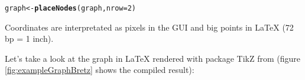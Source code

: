 \documentclass[a4paper, 10pt]{article}\usepackage[]{graphicx}\usepackage[]{color}
\makeatletter
\newcommand{\hlnum}[1]{\textcolor[rgb]{0.686,0.059,0.569}{#1}}%
\newcommand{\hlstd}[1]{\textcolor[rgb]{0.345,0.345,0.345}{#1}}%
\newcommand{\hlkwb}[1]{\textcolor[rgb]{0.69,0.353,0.396}{#1}}%
\newcommand{\hlkwc}[1]{\textcolor[rgb]{0.333,0.667,0.333}{#1}}%
\newcommand{\hlkwd}[1]{\textcolor[rgb]{0.737,0.353,0.396}{\textbf{#1}}}%
\newenvironment{kframe}{%
 \def\at@end@of@kframe{}%
 \ifinner\ifhmode%
  \def\at@end@of@kframe{\end{minipage}}%
  \begin{minipage}{\columnwidth}%
 \fi\fi%
 \def\FrameCommand##1{\hskip\@totalleftmargin \hskip-\fboxsep
 \colorbox{shadecolor}{##1}\hskip-\fboxsep
     \hskip-\linewidth \hskip-\@totalleftmargin \hskip\columnwidth}%
 \MakeFramed {\advance\hsize-\width
   \@totalleftmargin\z@ \linewidth\hsize
   \@setminipage}}%
 {\par\unskip\endMakeFramed%
 \at@end@of@kframe}
\newenvironment{knitrout}{}{} %
\numberwithin{equation}{section}
\theoremstyle{definition}
\theoremstyle{plain}
\makeatother
\begin{document}
\begin{knitrout}\footnotesize
{}\color{fgcolor}\begin{kframe}
\begin{alltt}
\hlstd{graph} \hlkwb{<-} \hlkwd{placeNodes}\hlstd{(graph,} \hlkwc{nrow} \hlstd{=} \hlnum{2}\hlstd{)}
\end{alltt}
\end{kframe}
\end{knitrout}


Coordinates are interpretated as pixels in the GUI and big points in
{\LaTeX} (72 bp = 1 inch).

Let's take a look at the graph in {\LaTeX} rendered with package TikZ from 
\cite{TikZ} (figure
\ref{fig:exampleGraphBretz} shows the compiled result):
\end{document}
